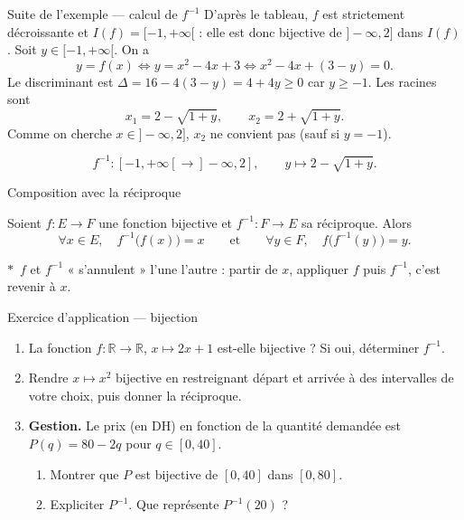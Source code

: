\documentclass[aspectratio=169,11pt]{beamer}
\providecommand{\faLightbulb}{$\ast$}
\newcommand{\R}{\mathbb{R}}
\newcommand{\fonc}[3]{#1\colon #2\to #3}
\begin{document}
\begin{frame}{Suite de l'exemple --- calcul de $f^{-1}$}
	D'après le tableau, $f$ est strictement décroissante et $I(f)=[-1,+\infty[$ :
	elle est donc bijective de $]-\infty,2]$ dans $I(f)$.
	Soit $y\in[-1,+\infty[$. On a
	\[
		y=f(x)\iff y=x^2-4x+3\iff x^2-4x+(3-y)=0.
	\]
	Le discriminant est $\Delta=16-4(3-y)=4+4y\ge 0$ car $y\ge -1$. Les racines sont
	\[
		x_1=2-\sqrt{1+y},\qquad x_2=2+\sqrt{1+y}.
	\]
	Comme on cherche $x\in]-\infty,2]$, $x_2$ ne convient pas (sauf si $y=-1$).
	\vspace{0.1cm}
	\begin{definitionbox}[Conclusion]
		\[
			\fonc{f^{-1}}{[-1,+\infty[}{]-\infty,2]}, \qquad
			y\longmapsto 2-\sqrt{1+y}.
		\]
	\end{definitionbox}
\end{frame}

\begin{frame}{Composition avec la réciproque}
	\begin{definitionbox}[Proposition 2.2]
		Soient $\fonc{f}{E}{F}$ une fonction bijective et $\fonc{f^{-1}}{F}{E}$ sa réciproque.
		Alors
		\[
			\forall x\in E,\quad f^{-1}\bigl(f(x)\bigr)=x
			\qquad\text{et}\qquad
			\forall y\in F,\quad f\bigl(f^{-1}(y)\bigr)=y.
		\]
	\end{definitionbox}
	\vspace{0.2cm}
	\begin{applicationbox}
		\faLightbulb\ $f$ et $f^{-1}$ « s'annulent » l'une l'autre :
		partir de $x$, appliquer $f$ puis $f^{-1}$, c'est revenir à $x$.
	\end{applicationbox}
\end{frame}

\begin{frame}{Exercice d'application --- bijection}
	\begin{exercicebox}[Exercice 2.6]
		\begin{enumerate}
			\item La fonction $\fonc{f}{\R}{\R}$, $x\longmapsto 2x+1$ est-elle bijective ?
			Si oui, déterminer $f^{-1}$.
			\item Rendre $x\longmapsto x^2$ bijective en restreignant départ et arrivée à des
			intervalles de votre choix, puis donner la réciproque.
			\item \textbf{Gestion.} Le prix (en DH) en fonction de la quantité demandée est
			$P(q)=80-2q$ pour $q\in[0,40]$.
			\begin{enumerate}
				\item Montrer que $P$ est bijective de $[0,40]$ dans $[0,80]$.
				\item Expliciter $P^{-1}$. Que représente $P^{-1}(20)$ ?
			\end{enumerate}
		\end{enumerate}
	\end{exercicebox}
\end{frame}
\end{document}
